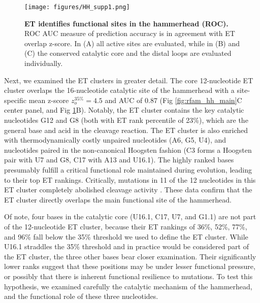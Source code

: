 \documentclass[12pt,a4paper]{report}
\begin{document}
\begin{figure}
\begin{minipage}[c][\textheight]{\textwidth}
\vspace*{-4in}
\centering
  \texttt{[image: figures/HH\_supp1.png]} %
  \caption[ET identifies functional sites in the hammerhead (ROC).]{\textbf{ET identifies functional sites in the hammerhead (ROC).} ROC AUC measure of prediction accuracy is in agreement with ET overlap z-score. In (A) all active sites are evaluated, while in (B) and (C) the conserved catalytic core and the distal loops are evaluated individually.}
  \label{fig:rfam_hh_supp1}
  \end{minipage}
\end{figure}



Next, we examined the ET clusters in greater detail. The core 12-nucleotide ET cluster overlaps the 16-nucleotide catalytic site of the hammerhead \cite{Nelson2008} with a site-specific mean z-score $z_{o}^{35\%}=4.5$  and AUC of 0.87 (Fig \ref{fig:rfam_hh_main}C center panel, and Fig \ref{fig:rfam_hh_supp1}B). Notably, the ET cluster contains the key catalytic nucleotides G12 and G8 (both with ET rank percentile of 23\%), which are the general base and acid in the cleavage reaction. The ET cluster is also enriched with thermodynamically costly unpaired nucleotides (A6, G5, U4), and nucleotides paired in the non-canonical Hoogsten fashion (C3 forms a Hoogsten pair with U7 and G8, C17 with A13 and U16.1). The highly ranked bases presumably fulfill a critical functional role maintained during evolution, leading to their top ET rankings. Critically, mutations in 11 of the 12 nucleotides in this ET cluster completely abolished cleavage activity \cite{Nelson2008}. These data confirm that the ET cluster directly overlaps the main functional site of the hammerhead. 

Of note, four bases in the catalytic core (U16.1, C17, U7, and G1.1) are not part of the 12-nucleotide ET cluster, because their ET rankings of 36\%, 52\%, 77\%, and 96\% fall below the 35\% threshold we used to define the ET cluster.  While U16.1 straddles the 35\% threshold and in practice would be considered part of the ET cluster, the three other bases bear closer examination. Their significantly lower ranks suggest that these positions may be under lesser functional pressure, or possibly that there is inherent functional resilience to mutations. To test this hypothesis, we examined carefully the catalytic mechanism of the hammerhead, and the functional role of these three nucleotides.
\end{document}
